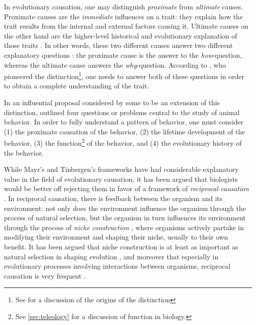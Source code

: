 In evolutionary causation, one may distinguish \emph{proximate} from \emph{ultimate} causes.
Proximate causes are the \emph{immediate} influences on a trait: they explain how the trait results from the internal and external factors causing it.
Ultimate causes on the other hand are the higher-level historical and evolutionary explanation of those traits \citep{Mayr61}. In other words, these two different causes answer two different explanatory questions : the proximate cause is the answer to the \emph{how}-question, whereas the ultimate cause answers the \emph{why}-question. According to \citet{Mayr61}, who pioneered the distinction\footnote{See \citep{Laland13} for a discussion of the origins of the distinction}, one needs to answer both of these questions in order to obtain a complete understanding of the trait.

In an influential proposal considered by some to be an extension of this distinction, \citet{Tinbergen63} outlined four questions or problems central to the study of animal behavior. In order to fully understand a pattern of behavior, one must consider (1) the proximate causation of the behavior, (2) the lifetime development of the behavior, (3) the function\footnote{See \cref{sec:teleology} for a discussion of function in biology.} of the behavior, and (4) the evolutionary history of the behavior.

While Mayr's and Tinbergen's frameworks have had considerable explanatory value in the field of evolutionary causation, it has been argued that biologists would be better off rejecting them in favor of a framework of \emph{reciprocal causation} \citep{Laland13}.
In reciprocal causation, there is feedback between the organism and its environment: not only does the environment influence the organism through the process of natural selection, but the organism in turn influences its environment through the process of \emph{niche construction} \citep{Svensson18}, where organisms actively partake in modifying their environment and shaping their niche, usually to their own benefit. It has been argued that niche construction is at least as important as natural selection in shaping evolution , and moreover that especially in evolutionary processes involving interactions between organisms, reciprocal causation is very frequent \citep{Svensson18}.

